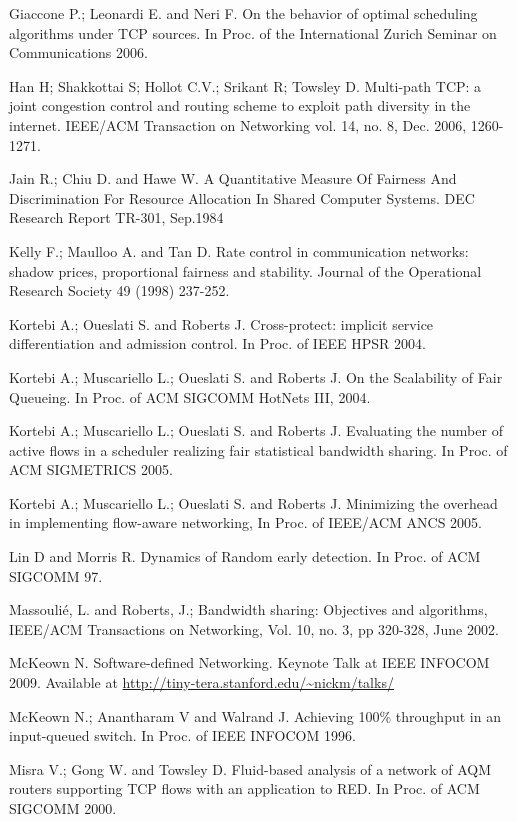 \documentclass[a4paper,oneside, 11pt]{article}
\begin{document}
Giaccone P.; Leonardi E. and Neri F.
On the behavior of optimal scheduling algorithms under TCP sources.
In Proc. of the International Zurich Seminar on Communications 2006.

Han H; Shakkottai S; Hollot C.V.; Srikant R; Towsley D.
Multi-path TCP: a joint congestion control and routing scheme to exploit path diversity in the internet.
IEEE/ACM Transaction on Networking vol. 14, no. 8, Dec. 2006, 1260-1271.

Jain R.; Chiu D.  and  Hawe W.
A Quantitative Measure Of Fairness And Discrimination For Resource Allocation In Shared Computer Systems.
DEC Research Report TR-301, Sep.1984

Kelly F.; Maulloo A. and Tan D.
Rate control in communication networks: shadow prices, proportional fairness and stability.
Journal of the Operational Research Society 49 (1998) 237-252.

Kortebi A.;  Oueslati S. and  Roberts J.
Cross-protect: implicit service differentiation and admission control.
In Proc. of IEEE HPSR 2004.
	
Kortebi A.; Muscariello L.; Oueslati S. and  Roberts J.
On the Scalability of Fair Queueing.
In Proc. of  ACM SIGCOMM  HotNets III, 2004.

Kortebi A.; Muscariello L.; Oueslati S. and  Roberts J.
Evaluating the number of active flows in a scheduler realizing fair statistical bandwidth
sharing. In  Proc. of ACM SIGMETRICS  2005.

Kortebi A.; Muscariello L.; Oueslati S. and  Roberts J.
Minimizing the overhead in implementing flow-aware networking,
In Proc. of IEEE/ACM  ANCS 2005.

Lin D and Morris R.
Dynamics of Random early detection.
In Proc. of ACM SIGCOMM 97.

Massouli\'{e}, L. and Roberts, J.;
Bandwidth sharing: Objectives and algorithms,
IEEE/ACM Transactions on Networking, Vol. 10, no. 3, pp 320-328, June 2002.

McKeown N. Software-defined Networking. Keynote Talk at IEEE INFOCOM 2009.
Available at \url{http://tiny-tera.stanford.edu/~nickm/talks/}

McKeown N.; Anantharam V and  Walrand J.  Achieving 100\% throughput in an input-queued switch.
In Proc. of IEEE INFOCOM 1996.

Misra V.; Gong W. and Towsley D.
Fluid-based analysis of a network of AQM routers supporting TCP flows with an application to RED.
In Proc. of ACM  SIGCOMM  2000.
\end{document}
